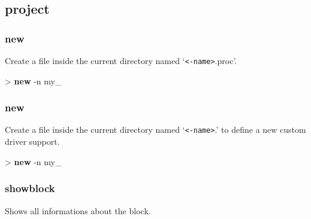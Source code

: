 \documentclass[10pt,a4paper]{article}
\begin{document}
\subsection{project}
\subsubsection{new}

Create a \kind{} file inside the current directory named `\texttt{<\kind{}-name>}.proc'.\\


\begin{sampletitle}
> \textbf{\tool{} new\kind{}} -n my\_\kind{}
\end{sampletitle}

\subsubsection{new}

Create a \kind{} file inside the current directory named `\texttt{<\kind{}-name>}.\kind{}' to define a new custom \kind{} driver support.\\


\begin{sampletitle}
> \textbf{\tool{} new} -n my\_\kind{}
\end{sampletitle}

\subsubsection{showblock}

Shows all informations about the block.
\end{document}
